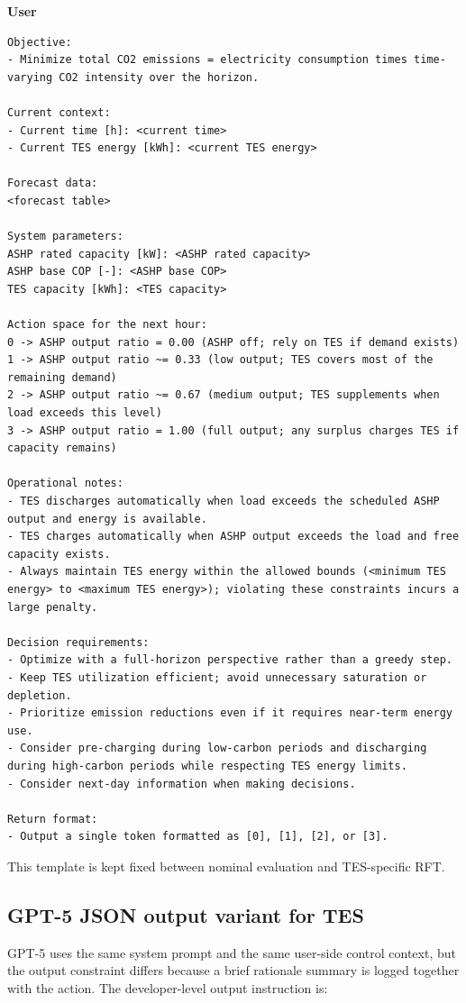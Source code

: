 \documentclass[11pt]{article}
\newcommand{\promptrole}[1]{\par\Needspace*{6\baselineskip}\noindent\textbf{#1}\par\nopagebreak}
\begin{document}
\promptrole{User}
\begin{lstlisting}[style=promptblock]
Objective:
- Minimize total CO2 emissions = electricity consumption times time-varying CO2 intensity over the horizon.

Current context:
- Current time [h]: <current time>
- Current TES energy [kWh]: <current TES energy>

Forecast data:
<forecast table>

System parameters:
ASHP rated capacity [kW]: <ASHP rated capacity>
ASHP base COP [-]: <ASHP base COP>
TES capacity [kWh]: <TES capacity>

Action space for the next hour:
0 -> ASHP output ratio = 0.00 (ASHP off; rely on TES if demand exists)
1 -> ASHP output ratio ~= 0.33 (low output; TES covers most of the remaining demand)
2 -> ASHP output ratio ~= 0.67 (medium output; TES supplements when load exceeds this level)
3 -> ASHP output ratio = 1.00 (full output; any surplus charges TES if capacity remains)

Operational notes:
- TES discharges automatically when load exceeds the scheduled ASHP output and energy is available.
- TES charges automatically when ASHP output exceeds the load and free capacity exists.
- Always maintain TES energy within the allowed bounds (<minimum TES energy> to <maximum TES energy>); violating these constraints incurs a large penalty.

Decision requirements:
- Optimize with a full-horizon perspective rather than a greedy step.
- Keep TES utilization efficient; avoid unnecessary saturation or depletion.
- Prioritize emission reductions even if it requires near-term energy use.
- Consider pre-charging during low-carbon periods and discharging during high-carbon periods while respecting TES energy limits.
- Consider next-day information when making decisions.

Return format:
- Output a single token formatted as [0], [1], [2], or [3].
\end{lstlisting}

This template is kept fixed between nominal evaluation and TES-specific RFT.

\subsection{GPT-5 JSON output variant for TES}
GPT-5 uses the same system prompt and the same user-side control context, but the output constraint differs because a brief rationale summary is logged together with the action. The developer-level output instruction is:
\end{document}
